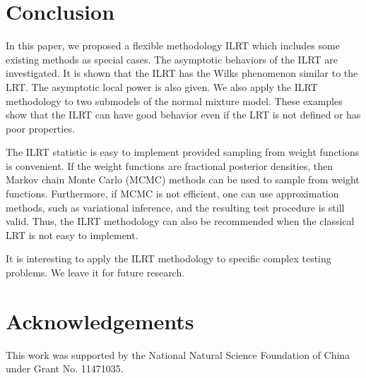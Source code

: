 \documentclass[11pt]{article}
\theoremstyle{plain}
\theoremstyle{definition}
\theoremstyle{remark}
\begin{document}



\section{Conclusion}
In this paper, we proposed a flexible methodology ILRT which includes some existing methods as special cases.
The asymptotic behaviors of the ILRT are investigated.
It is shown that the ILRT has the Wilks phenomenon similar to the LRT.
The asymptotic local power is also given.
We also apply the ILRT methodology to two submodels of the normal mixture model.
These examples show that the ILRT can have good behavior even if the LRT is not defined or has poor properties.


The ILRT statistic is easy to implement provided sampling from weight functions is convenient.
If the weight functions are fractional posterior densities, then Markov chain Monte Carlo (MCMC) methods can be used to sample from weight functions.
Furthermore, if MCMC is not efficient, one can use approximation methods, such as variational inference, and the resulting test procedure is still valid.
Thus, the ILRT methodology can also be recommended when the classical LRT is not easy to implement.

It is interesting to apply the ILRT methodology to specific complex testing problems.
We leave it for future research.

\section*{Acknowledgements}
This work was supported by the National Natural Science Foundation of China under Grant No. 11471035.
\end{document}
